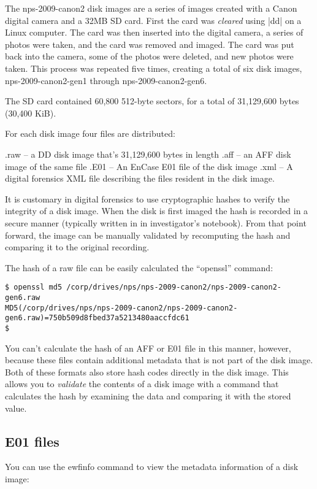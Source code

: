 The nps-2009-canon2 disk images are a series of images created with a
Canon digital camera and a 32MB SD card. First the card was
\emph{cleared} using |dd| on a Linux computer. The card was then
inserted into the digital camera, a series of photos were taken, and
the card was removed and imaged. The card was put back into the
camera, some of the photos were deleted, and new photos were
taken. This process was repeated five times, creating a total of six
disk images, nps-2009-canon2-gen1 through nps-2009-canon2-gen6.

The SD card contained 60,800 512-byte sectors, for a total of
31,129,600 bytes (30,400 KiB).

For each disk image four files are distributed:

   .raw -- a DD disk image that's 31,129,600 bytes in length
   .aff -- an AFF disk image of the same file
   .E01 -- An EnCase E01 file of the disk image
   .xml -- A digital forensics XML file describing the files resident
           in the disk image.


It is customary in digital forensics to use cryptographic hashes to
verify the integrity of a disk image. When the disk is first imaged
the hash is recorded in a secure manner (typically written in in
investigator's notebook). From that point forward, the image can be
manually validated by recomputing the hash and comparing it to the
original recording.

The hash of a raw file can be easily calculated the ``openssl''
command:

\begin{Verbatim}
$ openssl md5 /corp/drives/nps/nps-2009-canon2/nps-2009-canon2-gen6.raw
MD5(/corp/drives/nps/nps-2009-canon2/nps-2009-canon2-gen6.raw)=750b509d8fbed37a5213480aaccfdc61
$ 
\end{Verbatim}

You can't calculate the hash of an AFF or E01 file in this manner,
however, because these files contain additional metadata that is not
part of the disk image.  Both of these formats also store hash codes
directly in the disk image. This allows you to \emph{validate} the
contents of a disk image with a command that calculates the hash by
examining the data and comparing it with the stored value. 

\subsection{E01 files}
You can use the ewfinfo command to view the metadata information of a
disk image:

